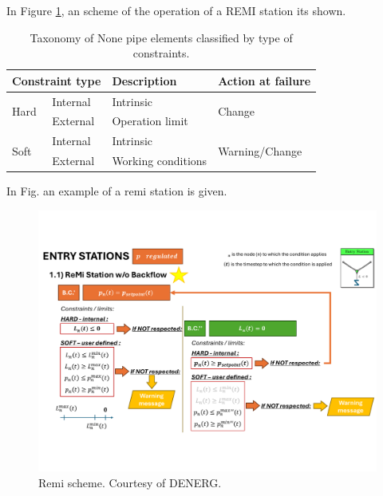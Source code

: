 



In Figure \ref{fig: schematic_remi},  an scheme of the operation of a REMI station its shown.

\begin{table}[H]
\centering
\caption{Taxonomy of None pipe elements classified by type of constraints.}
\begin{tabular}{llll}
\hline
\multicolumn{2}{l}{Constraint type}             & Description        & Action at failure                             \\ \hline
\multirow{2}{*}{Hard} & Internal                & Intrinsic          & \multirow{2}{*}{Change} \\
                      & External & Operation limit    &                      \\ \hline
\multirow{2}{*}{Soft} & Internal                & Intrinsic          & \multirow{2}{*}{Warning/Change}               \\
                      & External & Working conditions & \\ \hline        
    \end{tabular}
    \label{tab: taxonomy station}
\end{table}

In Fig. an example of a remi station is given.

\begin{figure}[H]
    \centering
    \includegraphics[scale=0.5]{img_memory/remi.pdf}
    \caption{Remi scheme. Courtesy of DENERG.}
    \label{fig: schematic_remi}
\end{figure}


